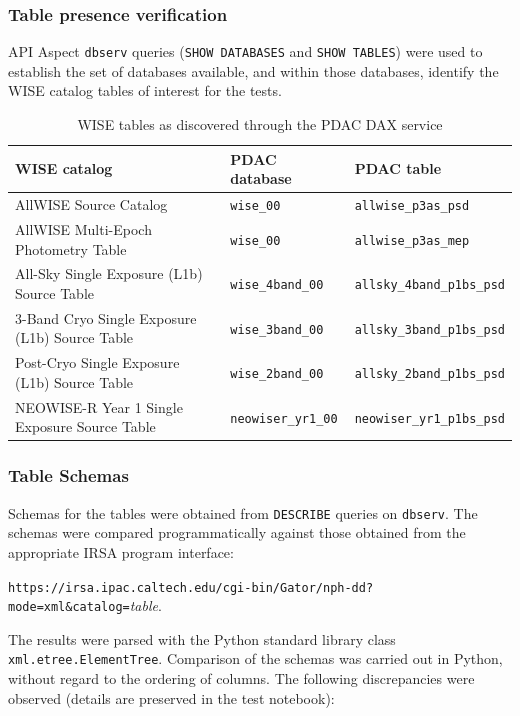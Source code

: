 \documentclass[DM,lsstdraft,STR,toc]{lsstdoc}
\begin{document}
\subsubsection{Table presence verification}
\label{sect:lsp-00-00-api-tables}

API Aspect \verb|dbserv| queries (\texttt{SHOW DATABASES} and \texttt{SHOW TABLES}) were used to establish the set of databases available, and within those databases, identify the WISE catalog tables of interest for the tests.

\begin{table}[h]
\centering
\begin{tabular}{p{} l l}
WISE catalog & PDAC database & PDAC table \\ \hline
AllWISE Source Catalog & \verb|wise_00| & \verb|allwise_p3as_psd| \\
AllWISE Multi-Epoch Photometry Table & \verb|wise_00| & \verb|allwise_p3as_mep| \\
All-Sky Single Exposure (L1b) Source Table & \verb|wise_4band_00| & \verb|allsky_4band_p1bs_psd| \\
3-Band Cryo Single Exposure (L1b) Source Table & \verb|wise_3band_00| & \verb|allsky_3band_p1bs_psd| \\
Post-Cryo Single Exposure (L1b) Source Table & \verb|wise_2band_00| & \verb|allsky_2band_p1bs_psd| \\
NEOWISE-R Year 1 Single Exposure Source Table & \verb|neowiser_yr1_00| & \verb|neowiser_yr1_p1bs_psd| \\
\end{tabular}
\caption{WISE tables as discovered through the PDAC DAX service}
\label{tab:wisetables}
\end{table}

\subsubsection{Table Schemas}
\label{sect:lsp-00-00-api-schema}

Schemas for the tables were obtained from \verb|DESCRIBE| queries on \verb|dbserv|.
The schemas were compared programmatically against those obtained from the 
appropriate IRSA program interface:

\begin{center}
\verb|https://irsa.ipac.caltech.edu/cgi-bin/Gator/nph-dd?mode=xml&catalog=|\textit{table}.
\end{center}

The results were parsed with the Python standard library class \verb|xml.etree.ElementTree|.
Comparison of the schemas was carried out in Python, without regard to the ordering of columns.
The following discrepancies were observed (details are preserved in the test notebook):
\end{document}
